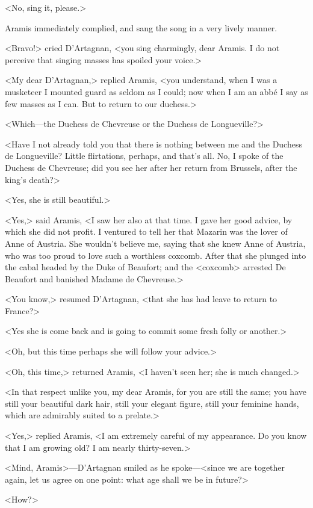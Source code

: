 <No, sing it, please.>

Aramis immediately complied, and sang the song in a very lively manner.

<Bravo!> cried D'Artagnan, <you sing charmingly, dear Aramis. I do not perceive that singing masses has spoiled your voice.>

<My dear D'Artagnan,> replied Aramis, <you understand, when I was a musketeer I mounted guard as seldom as I could; now when I am an abbé I say as few masses as I can. But to return to our duchess.>

<Which—the Duchess de Chevreuse or the Duchess de Longueville?>

<Have I not already told you that there is nothing between me and the Duchess de Longueville? Little flirtations, perhaps, and that's all. No, I spoke of the Duchess de Chevreuse; did you see her after her return from Brussels, after the king's death?>

<Yes, she is still beautiful.>

<Yes,> said Aramis, <I saw her also at that time. I gave her good advice, by which she did not profit. I ventured to tell her that Mazarin was the lover of Anne of Austria. She wouldn't believe me, saying that she knew Anne of Austria, who was too proud to love such a worthless coxcomb. After that she plunged into the cabal headed by the Duke of Beaufort; and the <coxcomb> arrested De Beaufort and banished Madame de Chevreuse.>

<You know,> resumed D'Artagnan, <that she has had leave to return to France?>

<Yes she is come back and is going to commit some fresh folly or another.>

<Oh, but this time perhaps she will follow your advice.>

<Oh, this time,> returned Aramis, <I haven't seen her; she is much changed.>

<In that respect unlike you, my dear Aramis, for you are still the same; you have still your beautiful dark hair, still your elegant figure, still your feminine hands, which are admirably suited to a prelate.>

<Yes,> replied Aramis, <I am extremely careful of my appearance. Do you know that I am growing old? I am nearly thirty-seven.>

<Mind, Aramis>—D'Artagnan smiled as he spoke—<since we are together again, let us agree on one point: what age shall we be in future?>

<How?>

